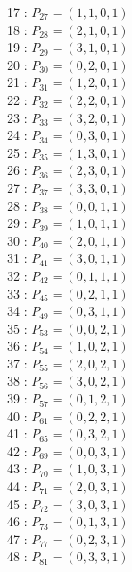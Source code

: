 \documentclass{article}
\begin{document}
{\begin{multicols}{3}
17 : $P_{27}=( 1, 1, 0, 1 )$\\
18 : $P_{28}=( 2, 1, 0, 1 )$\\
19 : $P_{29}=( 3, 1, 0, 1 )$\\
20 : $P_{30}=( 0, 2, 0, 1 )$\\
21 : $P_{31}=( 1, 2, 0, 1 )$\\
22 : $P_{32}=( 2, 2, 0, 1 )$\\
23 : $P_{33}=( 3, 2, 0, 1 )$\\
24 : $P_{34}=( 0, 3, 0, 1 )$\\
25 : $P_{35}=( 1, 3, 0, 1 )$\\
26 : $P_{36}=( 2, 3, 0, 1 )$\\
27 : $P_{37}=( 3, 3, 0, 1 )$\\
28 : $P_{38}=( 0, 0, 1, 1 )$\\
29 : $P_{39}=( 1, 0, 1, 1 )$\\
30 : $P_{40}=( 2, 0, 1, 1 )$\\
31 : $P_{41}=( 3, 0, 1, 1 )$\\
32 : $P_{42}=( 0, 1, 1, 1 )$\\
33 : $P_{45}=( 0, 2, 1, 1 )$\\
34 : $P_{49}=( 0, 3, 1, 1 )$\\
35 : $P_{53}=( 0, 0, 2, 1 )$\\
36 : $P_{54}=( 1, 0, 2, 1 )$\\
37 : $P_{55}=( 2, 0, 2, 1 )$\\
38 : $P_{56}=( 3, 0, 2, 1 )$\\
39 : $P_{57}=( 0, 1, 2, 1 )$\\
40 : $P_{61}=( 0, 2, 2, 1 )$\\
41 : $P_{65}=( 0, 3, 2, 1 )$\\
42 : $P_{69}=( 0, 0, 3, 1 )$\\
43 : $P_{70}=( 1, 0, 3, 1 )$\\
44 : $P_{71}=( 2, 0, 3, 1 )$\\
45 : $P_{72}=( 3, 0, 3, 1 )$\\
46 : $P_{73}=( 0, 1, 3, 1 )$\\
47 : $P_{77}=( 0, 2, 3, 1 )$\\
48 : $P_{81}=( 0, 3, 3, 1 )$\\
\end{multicols}


%


%


}%
\end{document}
